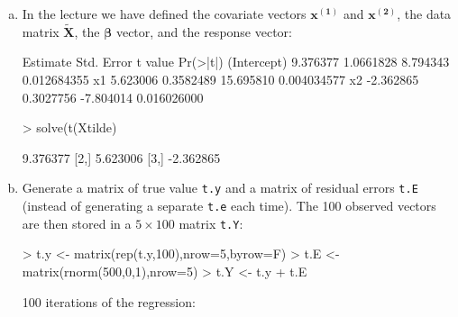 \documentclass[a4paper,12pt]{scrartcl}
\begin{document}
\begin{enumerate}[a)]
\item In the lecture we have defined the covariate vectors $\bm{x^{(1)}}$ and $\bm{x^{(2)}}$, the data matrix $\bm{\tilde{X}}$, the $\bm\beta$ vector, and the response vector:
\begin{Schunk}
\begin{Soutput}
             Estimate Std. Error   t value    Pr(>|t|)
(Intercept)  9.376377  1.0661828  8.794343 0.012684355
x1           5.623006  0.3582489 15.695810 0.004034577
x2          -2.362865  0.3027756 -7.804014 0.016026000
\end{Soutput}
\begin{Sinput}
> solve(t(Xtilde) %*% Xtilde)  %*%  t(Xtilde) %*% t.Y
\end{Sinput}
\begin{Soutput}
          [,1]
[1,]  9.376377
[2,]  5.623006
[3,] -2.362865
\end{Soutput}
\end{Schunk}

\item Generate a matrix of true value \texttt{t.y} and a matrix of residual errors \texttt{t.E} (instead of generating a separate \texttt{t.e} each time). The 100 observed vectors are then stored in a $5$ matrix \texttt{t.Y}: 
\begin{Schunk}
\begin{Sinput}
> t.y <- matrix(rep(t.y,100),nrow=5,byrow=F)
> t.E <- matrix(rnorm(500,0,1),nrow=5)
> t.Y <- t.y  + t.E
\end{Sinput}
\end{Schunk}

100 iterations of the regression:
\begin{Schunk}
\end{Schunk}


\end{enumerate}
\end{document}
